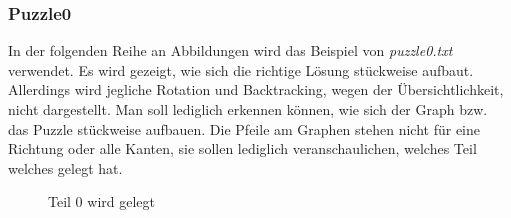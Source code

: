 \documentclass[a4paper, 12pt]{scrartcl}
\begin{document}
\subsubsection{Puzzle0}

In der folgenden Reihe an Abbildungen wird das Beispiel von \emph{puzzle0.txt} verwendet. Es wird gezeigt, wie sich die richtige Lösung stückweise aufbaut. Allerdings wird jegliche Rotation und Backtracking, wegen der Übersichtlichkeit, nicht dargestellt. Man soll lediglich erkennen können, wie sich der Graph bzw. das Puzzle stückweise aufbauen. Die Pfeile am Graphen stehen nicht für eine Richtung oder alle Kanten, sie sollen lediglich veranschaulichen, welches Teil welches gelegt hat.

\begin{figure}[H]
    \centering
    \begin{subfigure}[t]{0.45\textwidth}
        \centering
    \end{subfigure}
\hfill
    \begin{subfigure}[t]{0.45\textwidth}
    \centering

    \end{subfigure}
    \caption{Teil 0 wird gelegt}
\end{figure}
\end{document}
